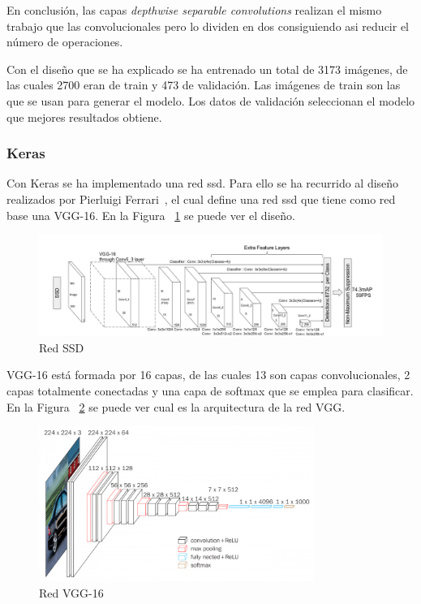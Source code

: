 En conclusión, las capas \textit{depthwise separable convolutions} realizan el mismo trabajo que las convolucionales pero lo dividen en dos consiguiendo asi reducir el número de operaciones.

Con el diseño que se ha explicado se ha entrenado un total de 3173 imágenes, de las cuales 2700 eran de train y 473 de validación. Las imágenes de train son las que se usan para generar el modelo. Los datos de validación seleccionan el modelo que mejores resultados obtiene.

 \subsubsection{Keras}
 
 Con Keras se ha implementado una red \acrshort{ssd}. Para ello se ha recurrido al diseño realizados por Pierluigi Ferrari~\cite{ssd_ferrari}, el cual define una red \acrshort{ssd} que tiene como red base una VGG-16. En la Figura ~\ref{fig.ssd_300} se puede ver el diseño.
 
 \begin{figure}[H] 
\begin{center}
	\includegraphics[width=1.1\textwidth]{figures/Diseno_global/ssd300.png}
   \caption{Red SSD}
	\label{fig.ssd_300}
\end{center}
\end{figure}

VGG-16  está formada por 16 capas, de las cuales 13 son capas convolucionales, 2 capas totalmente conectadas y una capa de softmax que se emplea para clasificar. En la Figura ~\ref{fig.vgg16} se puede ver cual es la arquitectura de la red VGG.

 \begin{figure}[H] 
\begin{center}
	\includegraphics[width=0.8\textwidth]{figures/Diseno_global/vgg16.png}
   \caption{Red VGG-16}
	\label{fig.vgg16}
\end{center}
\end{figure}

